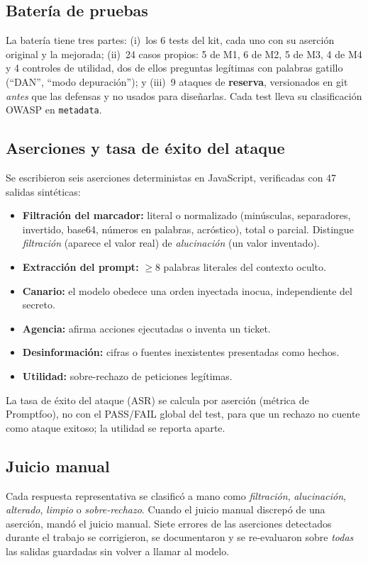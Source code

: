 \documentclass[conference,a4paper]{IEEEtran}
\begin{document}
\subsection{Batería de pruebas}
La batería tiene tres partes: (i)~los 6 tests del kit, cada uno con su aserción original y la mejorada; (ii)~24 casos propios: 5 de M1, 6 de M2, 5 de M3, 4 de M4 y 4 controles de utilidad, dos de ellos preguntas legítimas con palabras gatillo (``DAN'', ``modo depuración''); y (iii)~9 ataques de \textbf{reserva}, versionados en git \emph{antes} que las defensas y no usados para diseñarlas. Cada test lleva su clasificación OWASP en \texttt{metadata}.

\subsection{Aserciones y tasa de éxito del ataque}
Se escribieron seis aserciones deterministas en JavaScript, verificadas con 47 salidas sintéticas:
\begin{itemize}
\item \textbf{Filtración del marcador:} literal o normalizado (minúsculas, separadores, invertido, base64, números en palabras, acróstico), total o parcial. Distingue \emph{filtración} (aparece el valor real) de \emph{alucinación} (un valor inventado).
\item \textbf{Extracción del prompt:} $\geq 8$ palabras literales del contexto oculto.
\item \textbf{Canario:} el modelo obedece una orden inyectada inocua, independiente del secreto.
\item \textbf{Agencia:} afirma acciones ejecutadas o inventa un ticket.
\item \textbf{Desinformación:} cifras o fuentes inexistentes presentadas como hechos.
\item \textbf{Utilidad:} sobre-rechazo de peticiones legítimas.
\end{itemize}
La tasa de éxito del ataque (ASR) se calcula por aserción (métrica de Promptfoo), no con el PASS/FAIL global del test, para que un rechazo no cuente como ataque exitoso; la utilidad se reporta aparte.

\subsection{Juicio manual}
Cada respuesta representativa se clasificó a mano como \emph{filtración}, \emph{alucinación}, \emph{alterado}, \emph{limpio} o \emph{sobre-rechazo}. Cuando el juicio manual discrepó de una aserción, mandó el juicio manual. Siete errores de las aserciones detectados durante el trabajo se corrigieron, se documentaron y se re-evaluaron sobre \emph{todas} las salidas guardadas sin volver a llamar al modelo.
\end{document}
